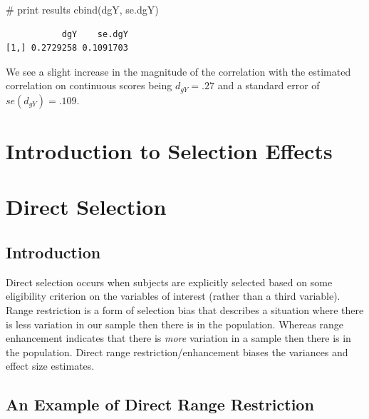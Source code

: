 \documentclass[
  letterpaper,
  DIV=11,
  numbers=noendperiod]{scrreprt}
\newenvironment{Shaded}{}{}
\newcommand{\CommentTok}[1]{\textcolor[rgb]{0.54,0.53,0.53}{#1}}
\newcommand{\FunctionTok}[1]{\textcolor[rgb]{0.39,0.29,0.61}{#1}}
\newcommand{\NormalTok}[1]{\textcolor[rgb]{0.12,0.11,0.11}{#1}}
\begin{document}
\begin{tcolorbox}
\begin{Shaded}
\begin{Highlighting}[]
\CommentTok{\# print results}
\FunctionTok{cbind}\NormalTok{(dgY, se.dgY)}
\end{Highlighting}
\end{Shaded}

\begin{verbatim}
           dgY    se.dgY
[1,] 0.2729258 0.1091703
\end{verbatim}

We see a slight increase in the magnitude of the correlation with the
estimated correlation on continuous scores being \(d_{gY}=.27\) and a
standard error of \(se(d_{gY})=.109\).

\end{tcolorbox}


\chapter{Introduction to Selection
Effects}\label{introduction-to-selection-effects}


\chapter{Direct Selection}\label{sec-direct_range_restriction}

\section{Introduction}\label{introduction-6}

Direct selection occurs when subjects are explicitly selected based on
some eligibility criterion on the variables of interest (rather than a
third variable). Range restriction is a form of selection bias that
describes a situation where there is less variation in our sample then
there is in the population. Whereas range enhancement indicates that
there is \emph{more} variation in a sample then there is in the
population. Direct range restriction/enhancement biases the variances
and effect size estimates.

\section{An Example of Direct Range
Restriction}\label{an-example-of-direct-range-restriction}
\end{document}
